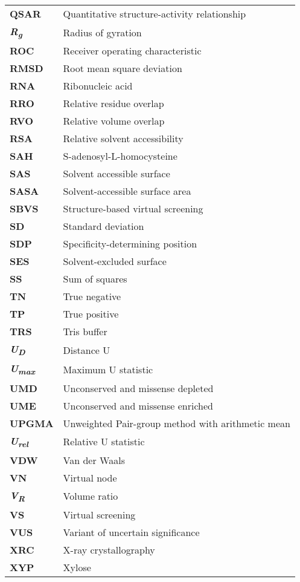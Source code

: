\begin{longtable}[l]{@{}p{2.5cm}p{12cm}@{}}
\textbf{QSAR} & Quantitative structure-activity relationship \\
\textbf{\textit{R\textsubscript{g}}} & Radius of gyration \\
\textbf{ROC} & Receiver operating characteristic \\
\textbf{RMSD} & Root mean square deviation \\
\textbf{RNA} & Ribonucleic acid \\
\textbf{RRO} & Relative residue overlap \\
\textbf{RVO} & Relative volume overlap \\
\textbf{RSA} & Relative solvent accessibility \\
\textbf{SAH} & S-adenosyl-L-homocysteine \\
\textbf{SAS} & Solvent accessible surface \\
\textbf{SASA} & Solvent-accessible surface area \\
\textbf{SBVS} & Structure-based virtual screening \\
\textbf{SD} & Standard deviation \\
\textbf{SDP} & Specificity-determining position \\
\textbf{SES} & Solvent-excluded surface \\
\textbf{SS} & Sum of squares \\
\textbf{TN} & True negative \\
\textbf{TP} & True positive \\
\textbf{TRS} & Tris buffer \\
\textbf{\textit{U\textsubscript{D}}} & Distance U \\
\textbf{\textit{U\textsubscript{max}}} & Maximum U statistic \\
\textbf{UMD} & Unconserved and missense depleted \\
\textbf{UME} & Unconserved and missense enriched \\
\textbf{UPGMA} & Unweighted Pair-group method with arithmetic mean \\
\textbf{\textit{U\textsubscript{rel}}} & Relative U statistic \\
\textbf{VDW} & Van der Waals \\
\textbf{VN} & Virtual node \\
\textbf{\textit{V\textsubscript{R}}} & Volume ratio \\
\textbf{VS} & Virtual screening \\
\textbf{VUS} & Variant of uncertain significance \\
\textbf{XRC} & X-ray crystallography \\
\textbf{XYP} & Xylose \\

\end{longtable}
